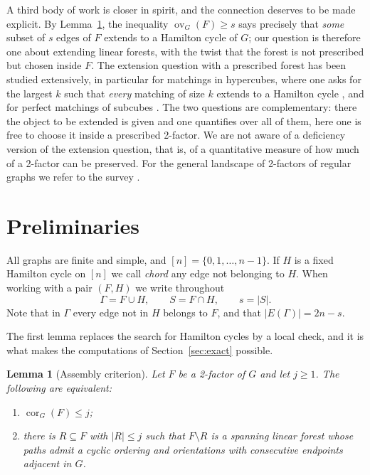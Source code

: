 \documentclass[11pt,a4paper]{article}
\newtheorem{lemma}[theorem]{Lemma}
\theoremstyle{definition}
\theoremstyle{remark}
\newcommand{\ov}{\operatorname{ov}}
\newcommand{\cor}{\operatorname{cor}}
\begin{document}
A third body of work is closer in spirit, and the connection deserves to be made explicit. By Lemma~\ref{lem:assembly}, the inequality $\ov_G(F)\ge s$ says precisely that \emph{some} subset of $s$ edges of $F$ extends to a Hamilton cycle of $G$; our question is therefore one about extending linear forests, with the twist that the forest is not prescribed but chosen inside $F$. The extension question with a prescribed forest has been studied extensively, in particular for matchings in hypercubes, where one asks for the largest $k$ such that \emph{every} matching of size $k$ extends to a Hamilton cycle \cite{wz16}, and for perfect matchings of subcubes \cite{gregor09}. The two questions are complementary: there the object to be extended is given and one quantifies over all of them, here one is free to choose it inside a prescribed 2-factor. We are not aware of a deficiency version of the extension question, that is, of a quantitative measure of how much of a 2-factor can be preserved. For the general landscape of 2-factors of regular graphs we refer to the survey \cite{labbate}.

\section{Preliminaries}\label{sec:prelim}

All graphs are finite and simple, and $[n]=\{0,1,\dots,n-1\}$. If $H$ is a fixed Hamilton cycle on $[n]$ we call \emph{chord} any edge not belonging to $H$. When working with a pair $(F,H)$ we write throughout
\[
\Gamma=F\cup H,\qquad S=F\cap H,\qquad s=|S| .
\]
Note that in $\Gamma$ every edge not in $H$ belongs to $F$, and that $|E(\Gamma)|=2n-s$.

The first lemma replaces the search for Hamilton cycles by a local check, and it is what makes the computations of Section~\ref{sec:exact} possible.

\begin{lemma}[Assembly criterion]\label{lem:assembly}
Let $F$ be a 2-factor of $G$ and let $j\ge1$. The following are equivalent:
\begin{enumerate}[label=(\alph*)]
\item $\cor_G(F)\le j$;
\item there is $R\subseteq F$ with $|R|\le j$ such that $F\setminus R$ is a spanning linear forest whose paths admit a cyclic ordering and orientations with consecutive endpoints adjacent in $G$.
\end{enumerate}
\end{lemma}
\end{document}
